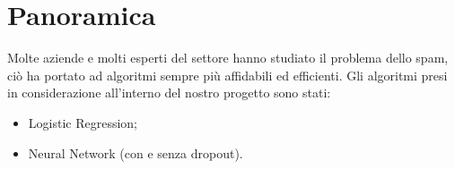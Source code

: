 \newpage
\section{Panoramica}
Molte aziende e molti esperti del settore hanno studiato il problema dello spam, ciò ha portato ad algoritmi sempre più affidabili ed efficienti.
Gli algoritmi presi in considerazione all'interno del nostro progetto sono stati:
\begin{itemize}
	\item Logistic Regression;
	\item Neural Network (con e senza dropout).
\end{itemize}